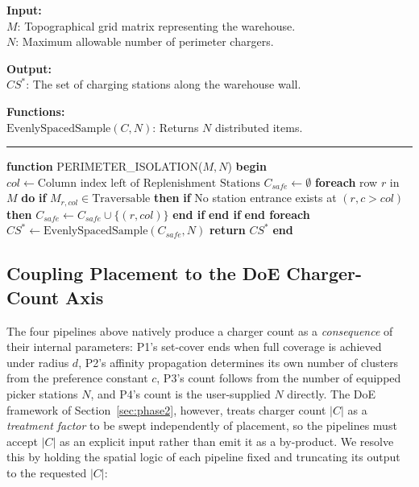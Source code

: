 \documentclass[conference]{IEEEtran}
\newcommand{\alginput}[1]{\vspace{0.2cm}\noindent\textbf{Input:}\\ \indent #1}
\newcommand{\algoutput}[1]{\vspace{0.2cm}\noindent\textbf{Output:}\\ \indent #1}
\newcommand{\algfunc}[1]{\vspace{0.2cm}\noindent\textbf{Functions:}\\ \indent #1}
\begin{document}
\begin{algorithm}[htbp]
\caption{PERIMETER\_ISOLATION: Wall Strategy}
\label{alg:perimeter}
\alginput{
$M$: Topographical grid matrix representing the warehouse.\\
$N$: Maximum allowable number of perimeter chargers.
}
\algoutput{
$CS^*$: The set of charging stations along the warehouse wall.
}
\algfunc{
$\text{EvenlySpacedSample}(C, N)$: Returns $N$ distributed items.
}
\vspace{0.2cm}
\hrule
\vspace{0.2cm}
\begin{algorithmic}[1]
\STATE \textbf{function} PERIMETER\_ISOLATION($M, N$)
\STATE \textbf{begin}
\STATE \quad $col \leftarrow \text{Column index left of Replenishment Stations}$
\STATE \quad $C_{safe} \leftarrow \emptyset$
\STATE \quad \textbf{foreach} row $r$ in $M$ \textbf{do}
\STATE \quad \quad \textbf{if} $M_{r, col} \in \text{Traversable}$ \textbf{then}
\STATE \quad \quad \quad \textbf{if} No station entrance exists at $(r, c > col)$ \textbf{then}
\STATE \quad \quad \quad \quad $C_{safe} \leftarrow C_{safe} \cup \{(r, col)\}$
\STATE \quad \quad \quad \textbf{end if}
\STATE \quad \quad \textbf{end if}
\STATE \quad \textbf{end foreach}
\STATE \quad $CS^* \leftarrow \text{EvenlySpacedSample}(C_{safe}, N)$
\STATE \quad \textbf{return} $CS^*$
\STATE \textbf{end}
\end{algorithmic}
\end{algorithm}

\subsection{Coupling Placement to the DoE Charger-Count Axis}
\label{sec:placement_doe_coupling}

The four pipelines above natively produce a charger count as a \emph{consequence} of their internal parameters: P1's set-cover ends when full coverage is achieved under radius $d$, P2's affinity propagation determines its own number of clusters from the preference constant $c$, P3's count follows from the number of equipped picker stations $N$, and P4's count is the user-supplied $N$ directly. The DoE framework of Section~\ref{sec:phase2}, however, treats charger count $|C|$ as a \emph{treatment factor} to be swept independently of placement, so the pipelines must accept $|C|$ as an explicit input rather than emit it as a by-product. We resolve this by holding the spatial logic of each pipeline fixed and truncating its output to the requested $|C|$:
\end{document}
